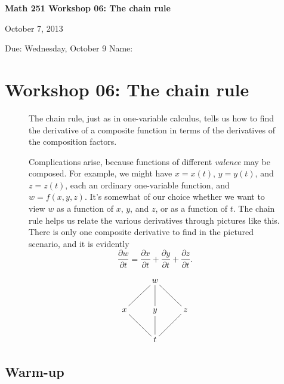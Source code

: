 \documentclass[12pt]{exam}
\theoremstyle{definition}
\begin{document}
\lstset{language=R}
\noindent
\textbf{{\large Math 251 \hfill Workshop 06: The chain rule}}

\noindent
October 7, 2013 

\noindent
Due: Wednesday, October 9 \hfill Name: \underline{\hspace{3in}} 

\noindent

\section{Workshop 06: The chain rule}

\begin{figure}[ht]
\begin{minipage}[t]{0.7\linewidth}
The chain rule, just as in one-variable calculus, tells us how to find the derivative of a composite function in terms of the derivatives of the composition factors.

Complications arise, because functions of different \emph{valence} may be composed. For example, we might have $x = x(t)$, $y = y(t)$, and $z = z(t)$, each an ordinary one-variable function, and $w = f(x,y,z)$. It's somewhat of our choice whether we want to view $w$ as a function of $x$, $y$, and $z$, or as a function of $t$. The chain rule helps us relate the various derivatives through pictures like this. There is only one composite derivative to find in the pictured scenario, and it is evidently
\begin{equation*}
    \frac{\partial w}{\partial t} = \frac{\partial x}{\partial t} + \frac{\partial y}{\partial t} + \frac{\partial z}{\partial t}.    
\end{equation*} 
\end{minipage} \hspace*{1cm}
\begin{minipage}[t]{0.25\linewidth}
    \begin{equation*}
        \xymatrix{
              & w \ar@{-}[dl] \ar@{-}[d] \ar@{-}[dr] & \\
            x \ar@{-}[dr] & y \ar@{-}[d] & z \ar@{-}[dl] \\
            & t & 
        }
    \end{equation*}
\end{minipage}
\end{figure}

\subsection{Warm-up}
\end{document}
